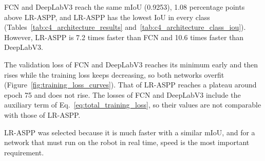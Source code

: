 FCN and DeepLabV3 reach the same mIoU (0.9253), 1.08 percentage points above LR-ASPP, and LR-ASPP has the lowest IoU in every class (Tables~\ref{tab:c4_architecture_results} and~\ref{tab:c4_architecture_class_iou}). However, LR-ASPP is 7.2 times faster than FCN and 10.6 times faster than DeepLabV3.

The validation loss of FCN and DeepLabV3 reaches its minimum early and then rises while the training loss keeps decreasing, so both networks overfit (Figure~\ref{fig:training_loss_curves}). That of LR-ASPP reaches a plateau around epoch 75 and does not rise. The losses of FCN and DeepLabV3 include the auxiliary term of Eq.~\eqref{eq:total_training_loss}, so their values are not comparable with those of LR-ASPP.

LR-ASPP was selected because it is much faster with a similar mIoU, and for a network that must run on the robot in real time, speed is the most important requirement.

\newcommand{\losscurveplot}[3]{%
    \begin{tikzpicture}
        \begin{axis}[losscurve]
            \addplot[blue!70!black] table[x=epoch, y=train_loss, col sep=comma]{data/training/training_log_#1.csv};
            \addplot[orange!90!black] table[x=epoch, y=val_loss, col sep=comma]{data/training/training_log_#1.csv};
            \addplot[only marks, mark=*, mark size=1.8pt, red!80!black] coordinates {(#2,#3)};
        \end{axis}
    \end{tikzpicture}%
}

